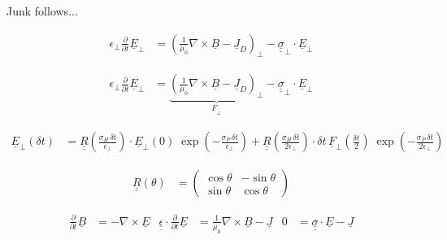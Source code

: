 \documentclass{article}
\begin{document}
Junk follows...



\begin{align*}
  \epsilon_\bot \frac{\partial}{\partial t} \underline{E}_\bot &=
    \left( \frac{1}{\mu_0} \nabla \times \underline{B} - 
    \underline{J}_D \right)_\bot - 
    \underline{ \underline{\sigma} }_\bot \cdot \underline{E}_\bot
\end{align*}






\begin{align*}
  \epsilon_\bot \frac{\partial}{\partial t} \underline{E}_\bot &=
    \underbrace{ \left( \frac{1}{\mu_0} \nabla \times \underline{B} - 
    \underline{J}_D \right)_\bot }_{ \underline{F}_\bot } - 
    \underline{ \underline{\sigma} }_\bot \cdot \underline{E}_\bot
\end{align*}




\begin{align*}
  \underline{E}_\bot \! \left( \delta t \right) &= 
    \underline{ \underline{R} } \left( \frac{ \sigma_H \, \delta t }{\epsilon_\bot} \right) \cdot
    \underline{E}_\bot \! \left( 0 \right) \;
      \exp \left( - \frac{ \sigma_P \, \delta t }{\epsilon_\bot} \right) + 
    \underline{ \underline{R} } \left( \frac{\sigma_H \, \delta t}{2 \epsilon_\bot} \right) \cdot
    \delta t \, \underline{F}_\bot \! \left( \frac{\delta t}{2} \right) \; \exp \left( - \frac{ \sigma_P \, \delta t }{ 2 \epsilon_\bot} \right)
\end{align*}






\begin{align*}
  \underline{ \underline{R} } \left( \theta \right) & = 
    \left( \begin{array}{cc}
    \cos\theta & -\sin\theta \\
    \sin\theta & \cos\theta \end{array} \right)
\end{align*}








\begin{align*}
  \frac{\partial}{\partial t} \underline{B} &=
    -\nabla \times \underline{E} & 
  \underline{ \underline{\epsilon} } \cdot \frac{\partial}{\partial t} \underline{E} &=
    \frac{1}{\mu_0} \nabla \times \underline{B} - \underline{J} &
  0 &=
    \underline{ \underline{\sigma} } \cdot \underline{E} - \underline{J}
\end{align*}
\end{document}

